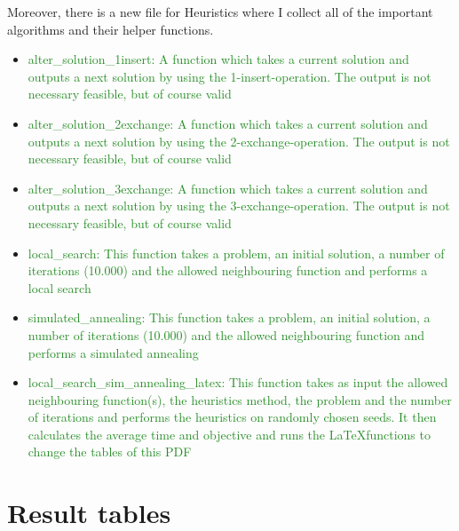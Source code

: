 \documentclass[a4paper,11pt]{article}
\theoremstyle{mytheor}
\begin{document}
\clearpage
Moreover, there is a new file for Heuristics where I collect all of the important algorithms and their helper functions.
\begin{itemize}
\item \textcolor{ForestGreen}{alter\_solution\_1insert: A function which takes a current solution and outputs a next solution by using the 1-insert-operation. The output is not necessary feasible, but of course valid}
\item \textcolor{ForestGreen}{alter\_solution\_2exchange: A function which takes a current solution and outputs a next solution by using the 2-exchange-operation. The output is not necessary feasible, but of course valid}
\item \textcolor{ForestGreen}{alter\_solution\_3exchange: A function which takes a current solution and outputs a next solution by using the 3-exchange-operation. The output is not necessary feasible, but of course valid}
\item \textcolor{ForestGreen}{local\_search: This function takes a problem, an initial solution, a number of iterations (10.000) and the allowed neighbouring function and performs a local search}
\item \textcolor{ForestGreen}{simulated\_annealing: This function takes a problem, an initial solution, a number of iterations (10.000) and the allowed neighbouring function and performs a simulated annealing}
\item \textcolor{ForestGreen}{local\_search\_sim\_annealing\_latex: This function takes as input the allowed neighbouring function(s), the heuristics method, the problem and the number of iterations and performs the heuristics on randomly chosen seeds. It then calculates the average time and objective and runs the \LaTeX functions to change the tables of this PDF}
\end{itemize}

\clearpage

\section{Result tables}

\end{document}
